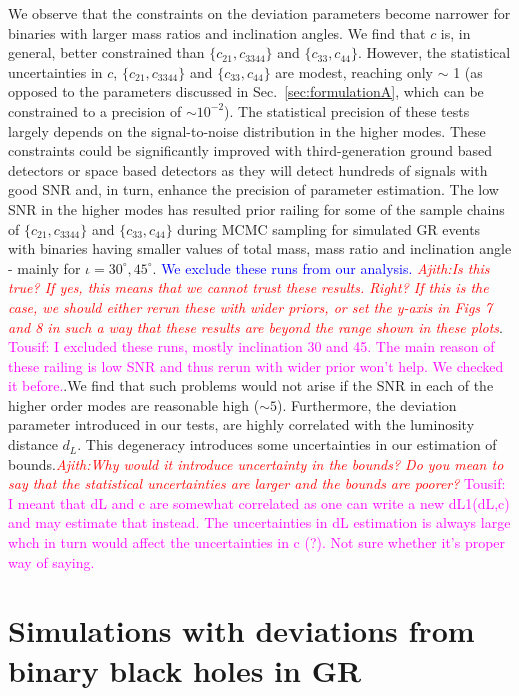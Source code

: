 \documentclass[prd,preprintnumbers,twocolumn,eqsecnum,floatfix,a4paper,nofootinbib,superscriptaddress]{revtex4}
\newcommand{\blue}[1]{\textcolor{blue}{#1}}
\newcommand{\ajith}[1]{\textcolor{red}{\textit{Ajith:#1}}}
\newcommand{\tousif}[1]{\textcolor{magenta}{Tousif: #1}}
\begin{document}
We observe that the constraints on the deviation parameters become narrower for binaries with larger mass ratios and inclination angles. We find that $c$ is, in general, better constrained than $\{c_{21}, c_{3344}\}$ and $\{c_{33}, c_{44}\}$. However, the statistical uncertainties in $c$, $\{c_{21}, c_{3344}\}$ and $\{c_{33}, c_{44}\}$ are modest, reaching only $\sim$ 1 (as opposed to the parameters discussed in Sec.~\ref{sec:formulationA}, which can be constrained to a precision of $\sim 10^{-2}$). The statistical precision of these tests largely depends on the signal-to-noise distribution in the higher modes. These constraints could be significantly improved with third-generation ground based detectors or space based detectors as they will detect hundreds of signals with good SNR and, in turn, enhance the precision of parameter estimation. The low SNR in the higher modes has resulted prior railing for some of the sample chains of $\{c_{21}, c_{3344}\}$ and $\{c_{33}, c_{44}\}$ during MCMC sampling for simulated GR events with binaries having smaller values of total mass, mass ratio and inclination angle - mainly for $\iota={30^{\circ},45^{\circ}}$. \blue{We exclude these runs from our analysis.}
\ajith{Is this true? If yes, this means that we cannot trust these results. Right? If this is the case, we should either rerun these with wider priors, or set the y-axis in Figs 7 and 8 in such a way that these results are beyond the range shown in these plots}. \tousif{I excluded these runs, mostly inclination 30 and 45. The main reason of these railing is low SNR and thus rerun with wider prior won't help. We checked it before.}.We find that such problems would not arise if the SNR in each of the higher order modes are reasonable high ($\sim 5$). Furthermore, the deviation parameter introduced in our tests, are highly correlated with the luminosity distance $d_L$. This degeneracy introduces some uncertainties in our estimation of bounds.\ajith{Why would it introduce uncertainty in the bounds? Do you mean to say that the statistical uncertainties are larger and the bounds are poorer?} \tousif{I meant that dL and c are somewhat correlated as one can write a new dL1(dL,c) and may estimate that instead. The uncertainties in dL estimation is always large whch in turn would affect the uncertainties in c (?). Not sure whether it's proper way of saying.}

\section{Simulations with deviations from binary black holes in GR}
\end{document}
